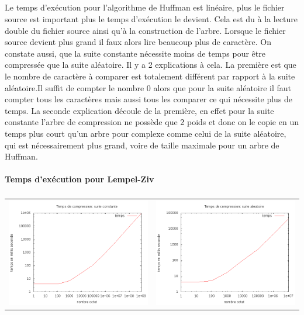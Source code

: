\documentclass{report}
\begin{document}
\subparagraph*{}
Le temps d'exécution pour l’algorithme de Huffman est linéaire, plus le fichier source est important plus le temps d'exécution le devient. Cela est du à la lecture double du fichier source ainsi qu'à la construction de l'arbre. Lorsque le fichier source devient plus grand il faux alors lire beaucoup plus de caractère.    
On constate aussi, que la suite constante nécessite moins de temps pour être compressée que la suite aléatoire. Il y a 2 explications à cela. La première est que le nombre de caractère à comparer est totalement différent par rapport à la suite aléatoire.Il suffit de compter le nombre 0 alors que pour la suite aléatoire il faut compter tous les caractères mais aussi tous les comparer ce qui nécessite plus de temps. La seconde explication découle de la première, en effet pour la suite constante l'arbre de compression ne possède que 2 poids et donc on le copie en un temps plus court qu'un arbre pour complexe comme celui de la suite aléatoire, qui est nécessairement plus grand, voire de taille maximale pour un arbre de Huffman.  

\paragraph*{}
\textbf{Temps d’exécution pour Lempel-Ziv}
\subparagraph*{}
\hspace{-2cm}\begin{tabular}{l | l}
\includegraphics[width=7cm]{tempsClzC.png} & 
\includegraphics[width=7cm]{tempsClzA.png}
\end{tabular}
\end{document}
